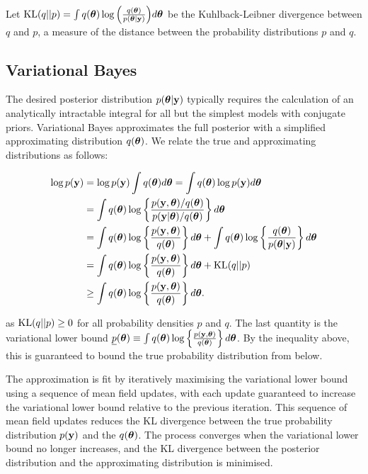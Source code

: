 \documentclass{amsart}[12pt]
\begin{document}
Let $\text{KL}(q||p) = \int q({\boldsymbol \theta}) \log{\left( \frac{q({\boldsymbol\theta})}{p({\boldsymbol\theta}|{\bf y})} \right)} d {\boldsymbol \theta}$ be the
Kuhlback-Leibner divergence between $q$ and $p$, a measure of the distance between the probability
distributions $p$ and $q$.

\subsection{Variational Bayes}

The desired posterior distribution $p({\boldsymbol \theta} | {\bf y})$ typically requires the calculation of an analytically
intractable integral for all but the simplest models with conjugate priors. Variational Bayes approximates
the full posterior with a simplified approximating distribution $q({\boldsymbol \theta})$. We relate the true and 
approximating distributions as follows:

\begin{align*}
\log p({\bf y}) &= \log p({\bf y}) \int q({\boldsymbol \theta}) d {\boldsymbol \theta} = \int q({\boldsymbol \theta}) \log p({\bf y}) d {\boldsymbol \theta} \\
&= \int q({\boldsymbol \theta}) \log \left\{ \frac{p({\bf y}, {\boldsymbol \theta}) / q({\boldsymbol \theta})}{p({\bf y}|{\boldsymbol \theta}) / q({\boldsymbol \theta})} \right\} d {\boldsymbol \theta} \\
&= \int q({\boldsymbol \theta}) \log\left\{ \frac{p({\bf y}, {\boldsymbol \theta})}{q({\boldsymbol \theta})} \right\} d {\boldsymbol \theta} +
		\int q({\boldsymbol \theta}) \log\left\{ \frac{q({\boldsymbol \theta})}{p({\boldsymbol \theta}|{\bf y})} \right\} d {\boldsymbol \theta} \\
&= \int q({\boldsymbol \theta}) \log\left\{ \frac{p({\bf y}, {\boldsymbol \theta})}{q({\boldsymbol \theta})} \right\} d {\boldsymbol \theta} +
		\text{KL}(q||p) \\
&\geq \int q({\boldsymbol \theta}) \log\left\{ \frac{p({\bf y}, {\boldsymbol \theta})}{q({\boldsymbol \theta})} \right\} d {\boldsymbol \theta}.
\end{align*}

as $\text{KL}(q||p) \geq 0$ for all probability densities $p$ and $q$. The last quantity is the variational lower
bound $\underline{p}({\boldsymbol \theta}) \equiv \int q({\boldsymbol \theta}) \log\left\{ \frac{p({\bf y}, {\boldsymbol \theta})}{q({\boldsymbol \theta})} \right\}
d{\boldsymbol \theta}$. By the inequality above, this is guaranteed to bound the true probability distribution from
below.

The approximation is fit by iteratively maximising the variational lower bound using a sequence of mean field
updates, with each update guaranteed to increase the variational lower bound relative to the previous
iteration. This sequence of mean field updates reduces the KL divergence between the true probability
distribution $p({\bf y})$ and the $q({\boldsymbol \theta})$. The process converges when the variational lower bound no longer
increases, and the KL divergence between the posterior distribution and the approximating distribution is
minimised.
\end{document}

